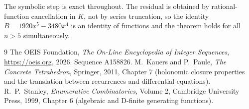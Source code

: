 \documentclass[11pt,a4paper]{article}
\theoremstyle{plain}
\theoremstyle{definition}
\begin{document}
The symbolic step is exact throughout. The residual is obtained by rational-function
cancellation in $K$, not by series truncation, so the identity $B=1920 x^{5} - 3480 x^{4}$ is an
identity of functions and the theorem holds for all $n>5$ simultaneously.

\begin{thebibliography}{9}
 The OEIS Foundation, \emph{The On-Line Encyclopedia of Integer Sequences},
\url{https://oeis.org}, 2026. Sequence A158826.
 M.~Kauers and P.~Paule, \emph{The Concrete Tetrahedron}, Springer, 2011,
Chapter 7 (holonomic closure properties and the translation between recurrences and
differential equations).
 R.~P.~Stanley, \emph{Enumerative Combinatorics}, Volume 2, Cambridge
University Press, 1999, Chapter 6 (algebraic and D-finite generating functions).
\end{thebibliography}
\end{document}
